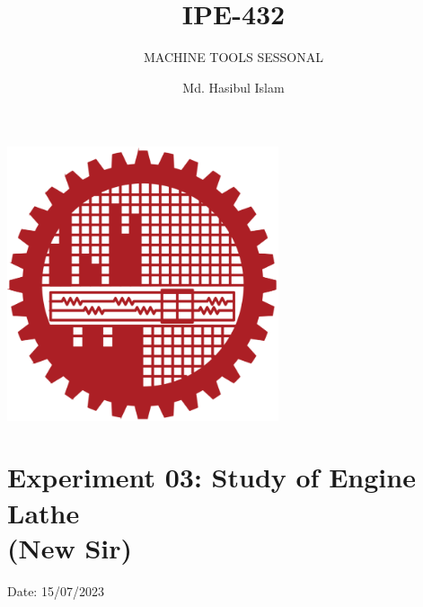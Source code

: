 \documentclass{article}
\title{IPE-432}
\author{Md. Hasibul Islam}
\subtitle{MACHINE TOOLS SESSONAL}
\begin{document}
\begin{titlepage}
    \centering
    
    {\Huge\bfseries\maketitle}
    \vspace{2cm}
    \includegraphics[width=8cm]{institution_logo.jpg}
    \vfill
    \vspace*{2cm}
\end{titlepage}

\tableofcontents 
\hrulefill

\section{Experiment 03: Study of Engine Lathe\\ (New Sir)} 
\hfill Date: 15/07/2023
\end{document}
